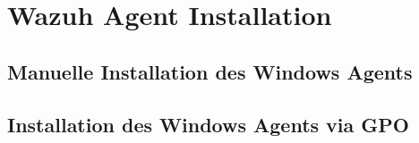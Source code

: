 \chapter{Wazuh Agent Installation}

\section{Manuelle Installation des Windows Agents}
\section{Installation des Windows Agents via GPO}
